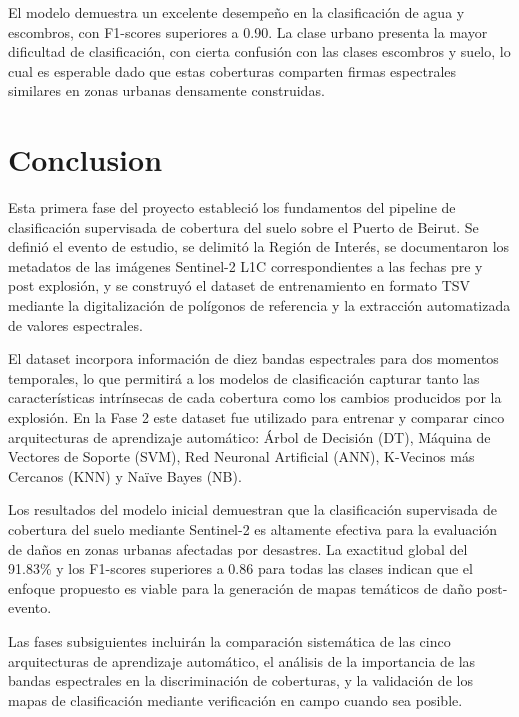 \documentclass[12pt, a4paper]{article}
\begin{document}
El modelo demuestra un excelente desempeño en la clasificación de agua y escombros, con
F1-scores superiores a 0.90. La clase urbano presenta la mayor dificultad de clasificación,
con cierta confusión con las clases escombros y suelo, lo cual es esperable dado que
estas coberturas comparten firmas espectrales similares en zonas urbanas densamente
construidas.

\section{Conclusion}

Esta primera fase del proyecto estableció los fundamentos del pipeline de clasificación
supervisada de cobertura del suelo sobre el Puerto de Beirut. Se definió el evento de
estudio, se delimitó la Región de Interés, se documentaron los metadatos de las imágenes
Sentinel-2 L1C correspondientes a las fechas pre y post explosión, y se construyó el
dataset de entrenamiento en formato TSV mediante la digitalización de polígonos de
referencia y la extracción automatizada de valores espectrales.

El dataset incorpora información de diez bandas espectrales para dos momentos temporales,
lo que permitirá a los modelos de clasificación capturar tanto las características
intrínsecas de cada cobertura como los cambios producidos por la explosión. En la Fase 2
este dataset fue utilizado para entrenar y comparar cinco arquitecturas de aprendizaje
automático: Árbol de Decisión (DT), Máquina de Vectores de Soporte (SVM), Red Neuronal
Artificial (ANN), K-Vecinos más Cercanos (KNN) y Naïve Bayes (NB).

Los resultados del modelo inicial demuestran que la clasificación supervisada de cobertura
del suelo mediante Sentinel-2 es altamente efectiva para la evaluación de daños en zonas
urbanas afectadas por desastres. La exactitud global del 91.83\% y los F1-scores superiores
a 0.86 para todas las clases indican que el enfoque propuesto es viable para la generación
de mapas temáticos de daño post-evento.

Las fases subsiguientes incluirán la comparación sistemática de las cinco arquitecturas
de aprendizaje automático, el análisis de la importancia de las bandas espectrales en la
discriminación de coberturas, y la validación de los mapas de clasificación mediante
verificación en campo cuando sea posible.
\end{document}
